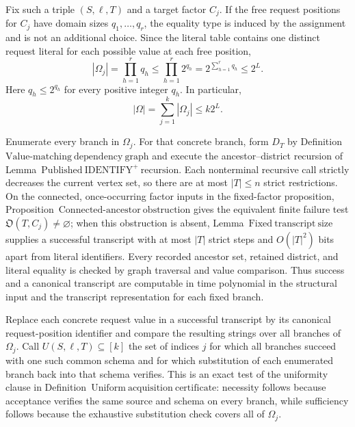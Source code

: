 Fix such a triple \((S,\ell,T)\) and a target factor \(C_j\).  If the free request positions for \(C_j\) have domain sizes \(q_1,\ldots,q_r\), the equality type is induced by the assignment and is not an additional choice.  Since the literal table contains one distinct request literal for each possible value at each free position,
\[
  |\Omega_j|=\prod_{h=1}^{r}q_h
  \leq \prod_{h=1}^{r}2^{q_h}
  =2^{\sum_{h=1}^{r}q_h}
  \leq 2^L. \tag{3}
\]
Here \(q_h\leq 2^{q_h}\) for every positive integer \(q_h\).  In particular,
\[
  |\Omega|=\sum_{j=1}^{k}|\Omega_j|\leq k2^L. \tag{4}
\]

Enumerate every branch in \(\Omega_j\).  For that concrete branch, form \(D_T\) by Definition~\(\mathrm{Value\text{-}matching\ dependency\ graph}\) and execute the ancestor--district recursion of Lemma~\(\mathrm{Published\ IDENTIFY^{+}\ recursion}\).  Each nonterminal recursive call strictly decreases the current vertex set, so there are at most \(|T|\leq n\) strict restrictions.  On the connected, once-occurring factor inputs in the fixed-factor proposition, Proposition~\(\mathrm{Connected\text{-}ancestor\ obstruction}\) gives the equivalent finite failure test \(\mathfrak O(T,C_j)\neq\varnothing\); when this obstruction is absent, Lemma~\(\mathrm{Fixed\ transcript\ size}\) supplies a successful transcript with at most \(|T|\) strict steps and \(O(|T|^2)\) bits apart from literal identifiers.  Every recorded ancestor set, retained district, and literal equality is checked by graph traversal and value comparison.  Thus success and a canonical transcript are computable in time polynomial in the structural input and the transcript representation for each fixed branch.

Replace each concrete request value in a successful transcript by its canonical request-position identifier and compare the resulting strings over all branches of \(\Omega_j\).  Call \(U(S,\ell,T)\subseteq[k]\) the set of indices \(j\) for which all branches succeed with one such common schema and for which substitution of each enumerated branch back into that schema verifies.  This is an exact test of the uniformity clause in Definition~\(\mathrm{Uniform\ acquisition\ certificate}\): necessity follows because acceptance verifies the same source and schema on every branch, while sufficiency follows because the exhaustive substitution check covers all of \(\Omega_j\).

